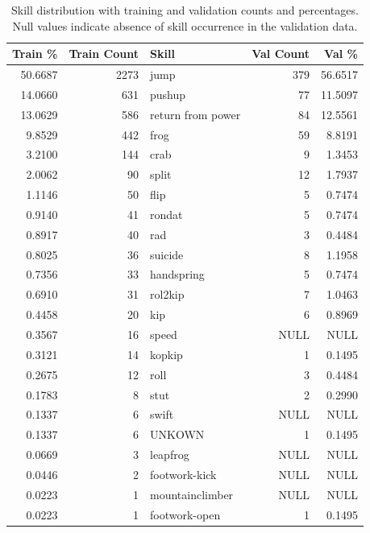 \begin{table}[h!]
    \centering
    \begin{tabular}{|r|r|l|r|r|}
        \hline
        \textbf{Train \%} & \textbf{Train Count} & \textbf{Skill} & \textbf{Val Count} & \textbf{Val \%} \\
        \hline
        50.6687 & 2273 & jump & 379 & 56.6517 \\
        14.0660 & 631 & pushup & 77 & 11.5097 \\
        13.0629 & 586 & return from power & 84 & 12.5561 \\
        9.8529 & 442 & frog & 59 & 8.8191 \\
        3.2100 & 144 & crab & 9 & 1.3453 \\
        2.0062 & 90 & split & 12 & 1.7937 \\
        1.1146 & 50 & flip & 5 & 0.7474 \\
        0.9140 & 41 & rondat & 5 & 0.7474 \\
        0.8917 & 40 & rad & 3 & 0.4484 \\
        0.8025 & 36 & suicide & 8 & 1.1958 \\
        0.7356 & 33 & handspring & 5 & 0.7474 \\
        0.6910 & 31 & rol2kip & 7 & 1.0463 \\
        0.4458 & 20 & kip & 6 & 0.8969 \\
        0.3567 & 16 & speed & NULL & NULL \\
        0.3121 & 14 & kopkip & 1 & 0.1495 \\
        0.2675 & 12 & roll & 3 & 0.4484 \\
        0.1783 & 8 & stut & 2 & 0.2990 \\
        0.1337 & 6 & swift & NULL & NULL \\
        0.1337 & 6 & UNKOWN & 1 & 0.1495 \\
        0.0669 & 3 & leapfrog & NULL & NULL \\
        0.0446 & 2 & footwork-kick & NULL & NULL \\
        0.0223 & 1 & mountainclimber & NULL & NULL \\
        0.0223 & 1 & footwork-open & 1 & 0.1495 \\
        \hline
    \end{tabular}
    \caption{Skill distribution with training and validation counts and percentages. Null values indicate absence of skill occurrence in the validation data.}
    \label{tab:skill_distribution_full_with_nulls}
\end{table}


